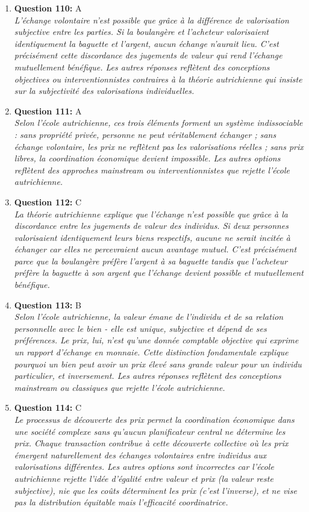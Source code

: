 \documentclass[12pt,a4paper]{article}
\begin{document}
\begin{enumerate}
\item \textbf{Question 110:} A
\\ \textit{L'échange volontaire n'est possible que grâce à la différence de valorisation subjective entre les parties. Si la boulangère et l'acheteur valorisaient identiquement la baguette et l'argent, aucun échange n'aurait lieu. C'est précisément cette discordance des jugements de valeur qui rend l'échange mutuellement bénéfique. Les autres réponses reflètent des conceptions objectives ou interventionnistes contraires à la théorie autrichienne qui insiste sur la subjectivité des valorisations individuelles.}

\item \textbf{Question 111:} A
\\ \textit{Selon l'école autrichienne, ces trois éléments forment un système indissociable : sans propriété privée, personne ne peut véritablement échanger ; sans échange volontaire, les prix ne reflètent pas les valorisations réelles ; sans prix libres, la coordination économique devient impossible. Les autres options reflètent des approches mainstream ou interventionnistes que rejette l'école autrichienne.}

\item \textbf{Question 112:} C
\\ \textit{La théorie autrichienne explique que l'échange n'est possible que grâce à la discordance entre les jugements de valeur des individus. Si deux personnes valorisaient identiquement leurs biens respectifs, aucune ne serait incitée à échanger car elles ne percevraient aucun avantage mutuel. C'est précisément parce que la boulangère préfère l'argent à sa baguette tandis que l'acheteur préfère la baguette à son argent que l'échange devient possible et mutuellement bénéfique.}

\item \textbf{Question 113:} B
\\ \textit{Selon l'école autrichienne, la valeur émane de l'individu et de sa relation personnelle avec le bien - elle est unique, subjective et dépend de ses préférences. Le prix, lui, n'est qu'une donnée comptable objective qui exprime un rapport d'échange en monnaie. Cette distinction fondamentale explique pourquoi un bien peut avoir un prix élevé sans grande valeur pour un individu particulier, et inversement. Les autres réponses reflètent des conceptions mainstream ou classiques que rejette l'école autrichienne.}

\item \textbf{Question 114:} C
\\ \textit{Le processus de découverte des prix permet la coordination économique dans une société complexe sans qu'aucun planificateur central ne détermine les prix. Chaque transaction contribue à cette découverte collective où les prix émergent naturellement des échanges volontaires entre individus aux valorisations différentes. Les autres options sont incorrectes car l'école autrichienne rejette l'idée d'égalité entre valeur et prix (la valeur reste subjective), nie que les coûts déterminent les prix (c'est l'inverse), et ne vise pas la distribution équitable mais l'efficacité coordinatrice.}


\end{enumerate}
\end{document}
